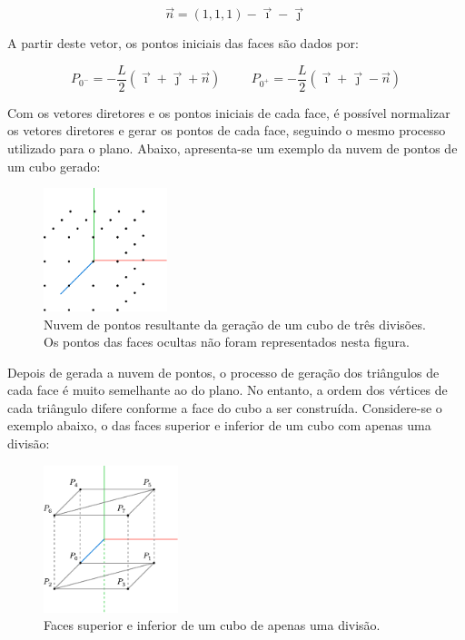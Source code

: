 \documentclass[12pt, a4paper]{article}
\begin{document}
$$
\vec{n} = (1, 1, 1) - \vec{\imath} - \vec{\jmath}
$$

A partir deste vetor, os pontos iniciais das faces são dados por:

$$
P_{0^-} = -\frac{L}{2} \left ( \vec{\imath} + \vec{\jmath} + \vec{n} \right )
\hspace{1cm}
P_{0^+} = -\frac{L}{2} \left ( \vec{\imath} + \vec{\jmath} - \vec{n} \right )
$$

Com os vetores diretores e os pontos iniciais de cada face, é possível normalizar os vetores
diretores e gerar os pontos de cada face, seguindo o mesmo processo utilizado para o plano. Abaixo,
apresenta-se um exemplo da nuvem de pontos de um cubo gerado:

\begin{figure}[H]
    \centering
    \includegraphics[width=0.32\textwidth]{res/phase1/figures/CubePoints.pdf}
    \caption{
        \onehalfspacing
        Nuvem de pontos resultante da geração de um cubo de três divisões. Os pontos das faces
        ocultas não foram representados nesta figura.
    }
\end{figure}

Depois de gerada a nuvem de pontos, o processo de geração dos triângulos de cada face é muito
semelhante ao do plano. No entanto, a ordem dos vértices de cada triângulo difere conforme a face do
cubo a ser construída. Considere-se o exemplo abaixo, o das faces superior e inferior de um cubo com
apenas uma divisão:

\begin{figure}[H]
    \centering
    \includegraphics[width=0.35\textwidth]{res/phase1/figures/CubeFaces.pdf}
    \caption{Faces superior e inferior de um cubo de apenas uma divisão.}
\end{figure}
\end{document}
